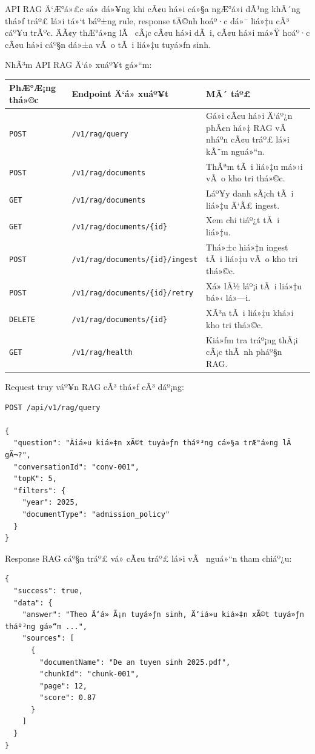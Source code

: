 ﻿\documentclass[12pt,a4paper]{report}
\begin{document}
API RAG Ä‘Æ°á»£c sá»­ dá»¥ng khi cÃ¢u há»i cá»§a ngÆ°á»i dÃ¹ng khÃ´ng thá»ƒ tráº£ lá»i tá»‘t báº±ng rule, response tÄ©nh hoáº·c dá»¯ liá»‡u cÃ³ cáº¥u trÃºc. ÄÃ¢y thÆ°á»ng lÃ  cÃ¡c cÃ¢u há»i dÃ i, cÃ¢u há»i má»Ÿ hoáº·c cÃ¢u há»i cáº§n dá»±a vÃ o tÃ i liá»‡u tuyá»ƒn sinh.

NhÃ³m API RAG Ä‘á» xuáº¥t gá»“m:

\begin{longtable}{|p{3cm}|p{5cm}|p{7cm}|}
\hline
\textbf{PhÆ°Æ¡ng thá»©c} & \textbf{Endpoint Ä‘á» xuáº¥t} & \textbf{MÃ´ táº£} \\
\hline
\texttt{POST} & \texttt{/v1/rag/query} & Gá»­i cÃ¢u há»i Ä‘áº¿n phÃ¢n há»‡ RAG vÃ  nháº­n cÃ¢u tráº£ lá»i kÃ¨m nguá»“n. \\
\hline
\texttt{POST} & \texttt{/v1/rag/documents} & ThÃªm tÃ i liá»‡u má»›i vÃ o kho tri thá»©c. \\
\hline
\texttt{GET} & \texttt{/v1/rag/documents} & Láº¥y danh sÃ¡ch tÃ i liá»‡u Ä‘Ã£ ingest. \\
\hline
\texttt{GET} & \texttt{/v1/rag/documents/\{id\}} & Xem chi tiáº¿t tÃ i liá»‡u. \\
\hline
\texttt{POST} & \texttt{/v1/rag/documents/\{id\}/ingest} & Thá»±c hiá»‡n ingest tÃ i liá»‡u vÃ o kho tri thá»©c. \\
\hline
\texttt{POST} & \texttt{/v1/rag/documents/\{id\}/retry} & Xá»­ lÃ½ láº¡i tÃ i liá»‡u bá»‹ lá»—i. \\
\hline
\texttt{DELETE} & \texttt{/v1/rag/documents/\{id\}} & XÃ³a tÃ i liá»‡u khá»i kho tri thá»©c. \\
\hline
\texttt{GET} & \texttt{/v1/rag/health} & Kiá»ƒm tra tráº¡ng thÃ¡i cÃ¡c thÃ nh pháº§n RAG. \\
\hline
\end{longtable}

Request truy váº¥n RAG cÃ³ thá»ƒ cÃ³ dáº¡ng:

\begin{verbatim}
POST /api/v1/rag/query

{
  "question": "Äiá»u kiá»‡n xÃ©t tuyá»ƒn tháº³ng cá»§a trÆ°á»ng lÃ  gÃ¬?",
  "conversationId": "conv-001",
  "topK": 5,
  "filters": {
    "year": 2025,
    "documentType": "admission_policy"
  }
}
\end{verbatim}

Response RAG cáº§n tráº£ vá» cÃ¢u tráº£ lá»i vÃ  nguá»“n tham chiáº¿u:

\begin{verbatim}
{
  "success": true,
  "data": {
    "answer": "Theo Ä‘á» Ã¡n tuyá»ƒn sinh, Ä‘iá»u kiá»‡n xÃ©t tuyá»ƒn tháº³ng gá»“m ...",
    "sources": [
      {
        "documentName": "De an tuyen sinh 2025.pdf",
        "chunkId": "chunk-001",
        "page": 12,
        "score": 0.87
      }
    ]
  }
}
\end{verbatim}
\end{document}
